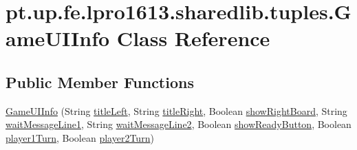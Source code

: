 \hypertarget{classpt_1_1up_1_1fe_1_1lpro1613_1_1sharedlib_1_1tuples_1_1_game_u_i_info}{}\section{pt.\+up.\+fe.\+lpro1613.\+sharedlib.\+tuples.\+Game\+U\+I\+Info Class Reference}
\label{classpt_1_1up_1_1fe_1_1lpro1613_1_1sharedlib_1_1tuples_1_1_game_u_i_info}
\subsection*{Public Member Functions}
\begin{DoxyCompactItemize}
\item 
\hyperlink{classpt_1_1up_1_1fe_1_1lpro1613_1_1sharedlib_1_1tuples_1_1_game_u_i_info_a186a08d459d5f3d54932137c06e023a6}{Game\+U\+I\+Info} (String \hyperlink{classpt_1_1up_1_1fe_1_1lpro1613_1_1sharedlib_1_1tuples_1_1_game_u_i_info_a979f065b051f0c2450588b3d0093112f}{title\+Left}, String \hyperlink{classpt_1_1up_1_1fe_1_1lpro1613_1_1sharedlib_1_1tuples_1_1_game_u_i_info_af1e57c20040e1ef254be8a9f71a2565e}{title\+Right}, Boolean \hyperlink{classpt_1_1up_1_1fe_1_1lpro1613_1_1sharedlib_1_1tuples_1_1_game_u_i_info_aacef642454df31ce436d72190e0a3c7a}{show\+Right\+Board}, String \hyperlink{classpt_1_1up_1_1fe_1_1lpro1613_1_1sharedlib_1_1tuples_1_1_game_u_i_info_a088ba8d6af2fd0abdcee747a70784831}{wait\+Message\+Line1}, String \hyperlink{classpt_1_1up_1_1fe_1_1lpro1613_1_1sharedlib_1_1tuples_1_1_game_u_i_info_aba46c97ac32127ca310d7c0a99206075}{wait\+Message\+Line2}, Boolean \hyperlink{classpt_1_1up_1_1fe_1_1lpro1613_1_1sharedlib_1_1tuples_1_1_game_u_i_info_a5a17ae59542293a41bea27646da05f7d}{show\+Ready\+Button}, Boolean \hyperlink{classpt_1_1up_1_1fe_1_1lpro1613_1_1sharedlib_1_1tuples_1_1_game_u_i_info_a0d33270d3239e508449e0804541611f8}{player1\+Turn}, Boolean \hyperlink{classpt_1_1up_1_1fe_1_1lpro1613_1_1sharedlib_1_1tuples_1_1_game_u_i_info_abc6dbaf67552fdd9ced5e5725ae2685b}{player2\+Turn})
\end{DoxyCompactItemize}
